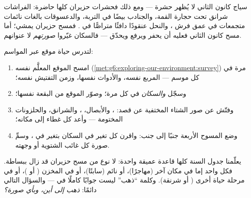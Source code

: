 \begin{example}\label{ex:g6:life-through-seasons:insects}
سياج كانون الثاني لا يُظهر حشرة --- ومع ذلك فحشرات حزيران كلها
حاضرة: الفراشات شرانق تحت حجارة القمة، والجنادب بيضًا في التربة،
والدعسوقات بالغات نائمات متجمعات في عمق فرش ، والنحل
عنقودًا دافئًا متراصًّا في . فمسح حزيران يمشي؛ أما مسح كانون
الثاني فعليه أن يحفر ويرفع ويحدّق --- فالسكان غيّروا \emph{صورتهم}
لا عنوانهم.
\end{example}

\begin{method}\label{met:g6:life-through-seasons:yearsurvey}
لتدرس حياة موقع عبر المواسم:
\begin{enumerate}
  \item امسح الموقع المعلَّم نفسه
        (\cref{met:g6:exploring-our-environment:survey}) مرة في
        كل موسم --- المربع نفسه، والأدوات نفسها، وزمن التفتيش
        نفسه؛
  \item وسجّل  \emph{والسكان} في كل مرة؛ وصوّر الموقع من
        البقعة نفسها؛
  \item وفتّش عن صور الشتاء المختفية عن قصد: ، والأبصال،
        ، والشرانق، والحلزونات المختومة --- وأعد كل غطاء
        إلى مكانه؛
  \item وضع المسوح الأربعة جنبًا إلى جنب: واقرن كل تغير في
        السكان بتغير في ، وسمِّ صورة كل غائب الشتوية أو
        وجهته.
\end{enumerate}
\end{method}

\begin{remark}\label{rem:g6:life-through-seasons:vanish}
يعلّمنا جدول السنة كلها قاعدة عميقة واحدة: لا نوع من  مسح
حزيران قد زال ببساطة. فكل واحد إما في مكان آخر (مهاجرًا)، أو نائم
(سابتًا)، أو في المخزن ( أو )، أو في مرحلة حياة أخرى (
أو شرنقة). وكلمة ``ذهب'' ليست جوابًا كاملًا في  --- والسؤال
التالي دائمًا: \emph{ذهب إلى أين، وبأي صورة؟}
\end{remark}

